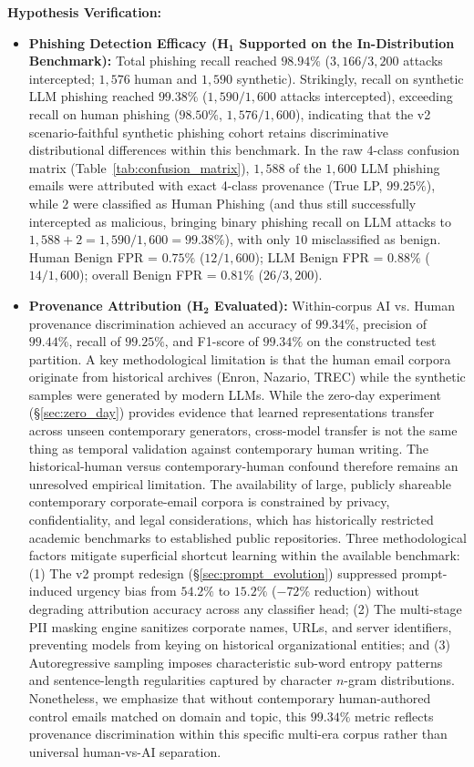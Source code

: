 \documentclass[journal]{IEEEtran}
\begin{document}
\textbf{Hypothesis Verification:}
\begin{itemize}
    \item \textbf{Phishing Detection Efficacy ($\mathbf{H_1}$ Supported on the In-Distribution Benchmark):} Total phishing recall reached $\mathbf{98.94\%}$ ($3{,}166 / 3{,}200$ attacks intercepted; $1{,}576$ human and $1{,}590$ synthetic). Strikingly, recall on synthetic LLM phishing reached $\mathbf{99.38\%}$ ($1{,}590 / 1{,}600$ attacks intercepted), exceeding recall on human phishing ($98.50\%$, $1{,}576 / 1{,}600$), indicating that the v2 scenario-faithful synthetic phishing cohort retains discriminative distributional differences within this benchmark. In the raw 4-class confusion matrix (Table~\ref{tab:confusion_matrix}), $1{,}588$ of the $1{,}600$ LLM phishing emails were attributed with exact 4-class provenance (True LP, $99.25\%$), while $2$ were classified as Human Phishing (and thus still successfully intercepted as malicious, bringing binary phishing recall on LLM attacks to $1{,}588 + 2 = 1{,}590 / 1{,}600 = 99.38\%$), with only $10$ misclassified as benign. Human Benign FPR = $0.75\%$ ($12/1{,}600$); LLM Benign FPR = $0.88\%$ ($14/1{,}600$); overall Benign FPR = $\mathbf{0.81\%}$ ($26/3{,}200$).
    \item \textbf{Provenance Attribution ($\mathbf{H_2}$ Evaluated):} Within-corpus AI vs. Human provenance discrimination achieved an accuracy of $\mathbf{99.34\%}$, precision of $\mathbf{99.44\%}$, recall of $\mathbf{99.25\%}$, and F1-score of $\mathbf{99.34\%}$ on the constructed test partition. A key methodological limitation is that the human email corpora originate from historical archives (Enron, Nazario, TREC) while the synthetic samples were generated by modern LLMs. While the zero-day experiment (\S\ref{sec:zero_day}) provides evidence that learned representations transfer across unseen contemporary generators, cross-model transfer is not the same thing as temporal validation against contemporary human writing. The historical-human versus contemporary-human confound therefore remains an unresolved empirical limitation. The availability of large, publicly shareable contemporary corporate-email corpora is constrained by privacy, confidentiality, and legal considerations, which has historically restricted academic benchmarks to established public repositories. Three methodological factors mitigate superficial shortcut learning within the available benchmark: (1) The v2 prompt redesign (\S\ref{sec:prompt_evolution}) suppressed prompt-induced urgency bias from $54.2\%$ to $15.2\%$ ($-72\%$ reduction) without degrading attribution accuracy across any classifier head; (2) The multi-stage PII masking engine sanitizes corporate names, URLs, and server identifiers, preventing models from keying on historical organizational entities; and (3) Autoregressive sampling imposes characteristic sub-word entropy patterns and sentence-length regularities captured by character $n$-gram distributions. Nonetheless, we emphasize that without contemporary human-authored control emails matched on domain and topic, this $99.34\%$ metric reflects provenance discrimination within this specific multi-era corpus rather than universal human-vs-AI separation.
\end{itemize}
\end{document}

